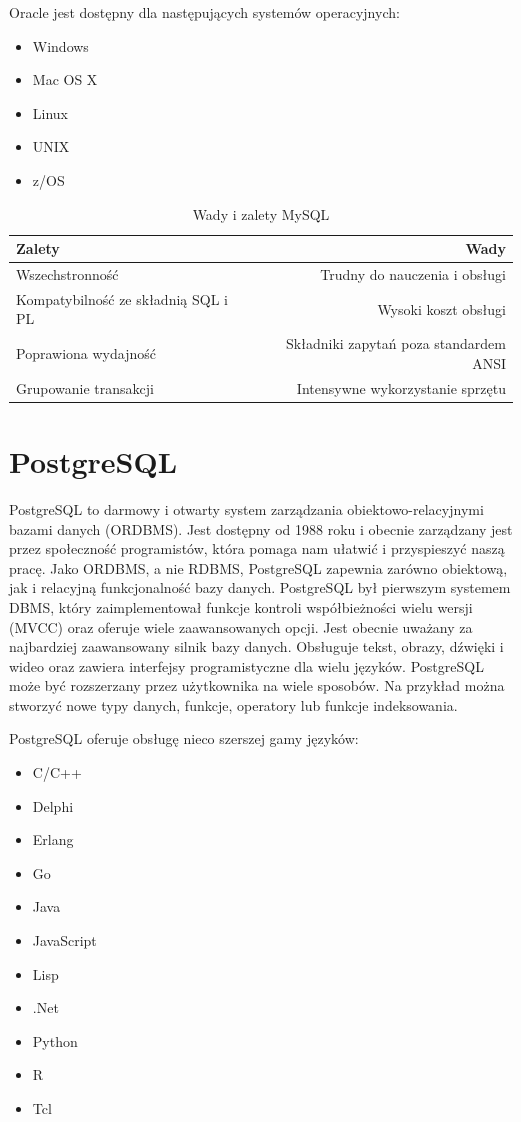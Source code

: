 \documentclass[oneside,polski,logo,indent]{amuthesis}
\begin{document}
\begin{enumerate}
\begin{enumerate}
Oracle jest dostępny dla następujących systemów operacyjnych: 
\begin{itemize}
\item Windows 
\item Mac OS X 
\item Linux 
\item UNIX 
\item z/OS 
\end{itemize}
\begin{table}[h!]
\caption{Wady i zalety MySQL}
\label{tabela-Oracle}
\centering
\begin{adjustbox}{width=1\textwidth}
\small
\begin{tabular}{|l|r|}
\toprule
Zalety & Wady\\
\midrule
Wszechstronność & Trudny do nauczenia i obsługi\\
Kompatybilność ze składnią SQL i PL & Wysoki koszt obsługi\\
Poprawiona wydajność & Składniki zapytań poza standardem ANSI \\
Grupowanie transakcji & Intensywne wykorzystanie sprzętu\\
\bottomrule
\end{tabular}
\end{adjustbox}
\end{table}
\section{PostgreSQL}
PostgreSQL to darmowy i otwarty system zarządzania obiektowo-relacyjnymi bazami danych (ORDBMS). Jest dostępny od 1988 roku i obecnie zarządzany jest przez społeczność programistów, która pomaga nam ułatwić i przyspieszyć naszą pracę.
Jako ORDBMS, a nie RDBMS, PostgreSQL zapewnia zarówno obiektową, jak i relacyjną funkcjonalność bazy danych. PostgreSQL był pierwszym systemem DBMS, który zaimplementował funkcje kontroli współbieżności wielu wersji (MVCC) oraz oferuje wiele zaawansowanych opcji. Jest obecnie uważany za najbardziej zaawansowany silnik bazy danych. Obsługuje tekst, obrazy, dźwięki i wideo oraz zawiera interfejsy programistyczne dla wielu języków. PostgreSQL może być rozszerzany przez użytkownika na wiele sposobów. Na przykład można stworzyć nowe typy danych, funkcje, operatory lub funkcje indeksowania. 


PostgreSQL oferuje obsługę nieco szerszej gamy języków: 
\begin{itemize}
\item C/C++ 
\item Delphi 
\item Erlang 
\item Go 
\item Java 
\item JavaScript 
\item Lisp 
\item .Net 
\item Python 
\item R 
\item Tcl 
\end{itemize}


\end{enumerate}
\end{enumerate}
\end{document}
